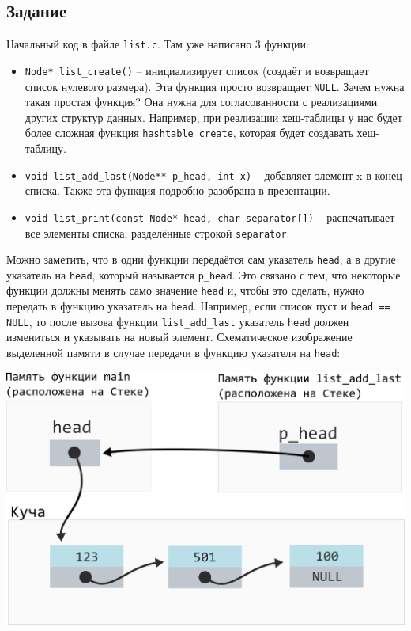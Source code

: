 \documentclass{article}
\begin{document}
\subsection*{Задание}
Начальный код в файле \texttt{list.c}. Там уже написано 3 функции:
\begin{itemize}
\item \texttt{Node* list\_create()} -- инициализирует список (создаёт и возвращает список нулевого размера). Эта функция просто возвращает \texttt{NULL}. Зачем нужна такая простая функция? Она нужна для согласованности с реализациями других структур данных. Например, при реализации хеш-таблицы у нас будет более сложная функция \texttt{hashtable\_create}, которая будет создавать хеш-таблицу.
\item \texttt{void list\_add\_last(Node** p\_head, int x)} -- добавляет элемент x в конец списка. Также эта функция подробно разобрана в презентации.
\item \texttt{void list\_print(const Node* head, char separator[])} -- распечатывает все элементы списка, разделённые строкой \texttt{separator}. 
\end{itemize}

Можно заметить, что в одни функции передаётся сам указатель \texttt{head}, а в другие указатель на \texttt{head}, который называется \texttt{p\_head}. Это связано с тем, что некоторые функции должны менять само значение \texttt{head} и, чтобы это сделать, нужно передать в функцию указатель на \texttt{head}. Например, если список пуст и \texttt{head == NULL}, то после вызова функции  \texttt{list\_add\_last} указатель \texttt{head} должен измениться и указывать на новый элемент. Схематическое изображение выделенной памяти в случае передачи в функцию указателя на \texttt{head}:


\begin{center}
\includegraphics[scale=0.8]{../images/p_head.png}
\end{center}
\end{document}
